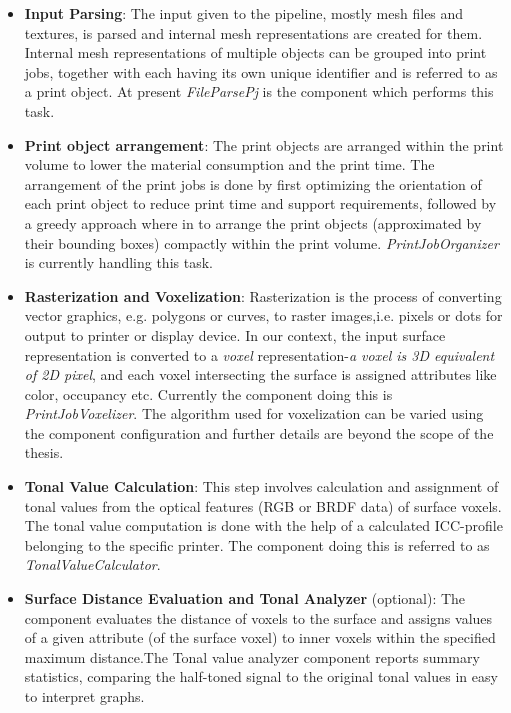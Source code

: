 \begin{itemize}
\item \textbf{Input Parsing}: The input given to the pipeline, mostly mesh files and textures, is parsed and internal mesh representations are created for them. Internal mesh representations of multiple objects can be grouped into print jobs, together with each having it\textquotesingle s own unique identifier and is referred to as a print object. At present \textit{FileParsePj} is the component which performs this task. \newline 

\item \textbf{Print object arrangement}: The print objects are arranged within the print volume to lower the material consumption and the print time. The arrangement of the print jobs is done by first optimizing the orientation of each print object to reduce print time and support requirements, followed by a greedy approach where in to arrange the print objects (approximated by their bounding boxes) compactly within the print volume. \textit{PrintJobOrganizer} is currently handling this task. \newline 

\item \textbf{Rasterization and Voxelization}: Rasterization is the process of converting vector graphics, e.g. polygons or curves, to raster images,i.e. pixels or dots for output to printer or display device. In our context, the input surface representation is converted to a \textit{voxel} representation-\textit{a voxel is 3D equivalent of 2D pixel}, and each voxel intersecting the surface is assigned attributes like color, occupancy etc. Currently the component doing this is \textit{PrintJobVoxelizer}. The algorithm used for voxelization can be varied using the component configuration and further details are beyond the scope of the thesis. \newline 
 
\item \textbf{Tonal Value Calculation}: This step involves calculation and assignment of tonal values from the optical features (RGB or BRDF data) of surface voxels. The tonal value computation is done with the help of a calculated ICC-profile  belonging to the specific printer. The component doing this is referred to as \textit{TonalValueCalculator}.

\item \textbf{Surface Distance Evaluation and Tonal Analyzer} (optional): The component evaluates the distance of voxels to the surface and assigns values of a given attribute (of the surface voxel)  to inner voxels within the specified maximum distance.The Tonal value analyzer component reports summary statistics, comparing the half-toned signal to the original tonal values in easy to interpret graphs.\newline


\end{itemize}
